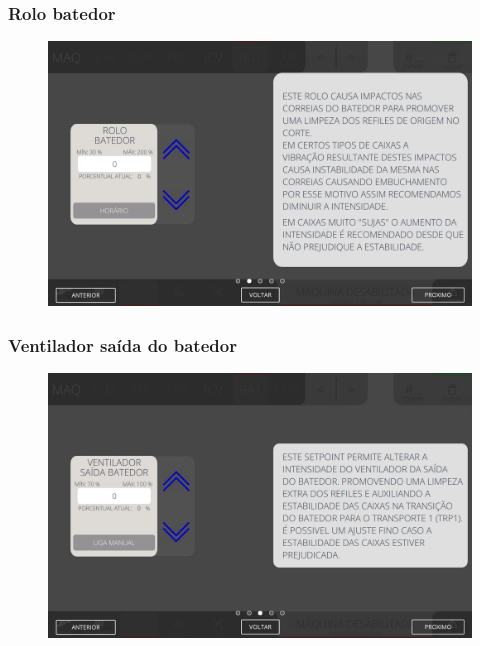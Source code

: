 \newpage
\thispagestyle{fancy}
\vspace*{40 pt}
\subsubsection{\small{Rolo batedor}} \label{sec:telaConfiguracoesBatedorRoloBatedor}
\vspace*{\fill}
\begin{figure}[h]
    \centering
    \includegraphics[width=576 px,height=360 px]{src/imagesICV/07-scout/settings/e-2.png}
\end{figure}
\vspace*{\fill}

\newpage
\thispagestyle{fancy}
\vspace*{40 pt}
\subsubsection{\small{Ventilador saída do batedor}} \label{sec:telaConfiguracoesBatedorVentiladorSaidaBatedor}
\vspace*{\fill}
\begin{figure}[h]
    \centering
    \includegraphics[width=576 px,height=360 px]{src/imagesICV/07-scout/settings/e-3.png}
\end{figure}
\vspace*{\fill}

